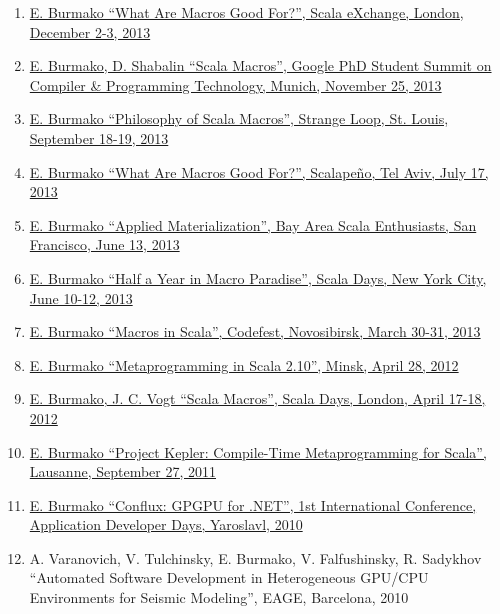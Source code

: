 \documentclass[margin, 10pt]{Stylesheet}
\begin{document}
\begin{resume}
\begin{enumerate}
\item \href{http://scalamacros.org/paperstalks/2014-02-04-WhatAreMacrosGoodFor.pdf}{E. Burmako ``What Are Macros Good For?'', Scala eXchange, London, December 2-3, 2013}
\item \href{http://scalamacros.org/paperstalks/2013-11-25-ScalaMacrosPoster.pdf}{E. Burmako, D. Shabalin ``Scala Macros'', Google PhD Student Summit on Compiler \& Programming Technology, Munich, November 25, 2013}
\item \href{http://scalamacros.org/paperstalks/2013-09-19-PhilosophyOfScalaMacros.pdf}{E. Burmako ``Philosophy of Scala Macros'', Strange Loop, St. Louis, September 18-19, 2013}
\item \href{http://scalamacros.org/paperstalks/2014-02-04-WhatAreMacrosGoodFor.pdf}{E. Burmako ``What Are Macros Good For?'', Scalape\~{n}o, Tel Aviv, July 17, 2013}
\item \href{http://scalamacros.org/paperstalks/2013-06-13-AppliedMaterialization.pdf}{E. Burmako ``Applied Materialization'', Bay Area Scala Enthusiasts, San Francisco, June 13, 2013}
\item \href{http://scalamacros.org/paperstalks/2013-06-12-HalfYearInMacroParadise.pdf}{E. Burmako ``Half a Year in Macro Paradise'', Scala Days, New York City, June 10-12, 2013}
\item \href{https://github.com/scalamacros/scalamacros.github.com/raw/master/paperstalks/2013-03-31-ScalaMacros.pdf}{E. Burmako ``Macros in Scala'', Codefest, Novosibirsk, March 30-31, 2013}
\item \href{https://github.com/scalamacros/scalamacros.github.com/raw/master/paperstalks/2012-04-28-MetaprogrammingInScala210.pdf}{E. Burmako ``Metaprogramming in Scala 2.10'', Minsk, April 28, 2012}
\item \href{https://github.com/scalamacros/scalamacros.github.com/raw/master/paperstalks/2012-04-18-ScalaDays2012.pdf}{E. Burmako, J. C. Vogt ``Scala Macros'', Scala Days, London, April 17-18, 2012}
\item \href{https://github.com/scalamacros/scalamacros.github.com/raw/master/paperstalks/2011-09-27-ProjectKepler.pdf}{E. Burmako ``Project Kepler: Compile-Time Metaprogramming for Scala'', Lausanne, September 27, 2011}
\item \href{https://code.google.com/archive/p/conflux/downloads}{E. Burmako ``Conflux: GPGPU for .NET'', 1st International Conference, Application Developer Days, Yaroslavl, 2010}
\item A. Varanovich, V. Tulchinsky, E. Burmako, V. Falfushinsky, R. Sadykhov ``Automated Software Development in Heterogeneous GPU/CPU Environments for Seismic Modeling'', EAGE, Barcelona, 2010
\end{enumerate}


\end{resume}
\end{document}
